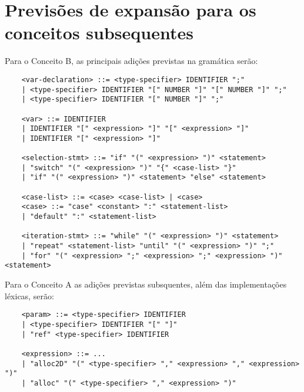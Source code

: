 \documentclass[10pt, a4paper]{article}
\begin{document}
\section{Previsões de expansão para os conceitos subsequentes}

Para o Conceito B, as principais adições previstas na gramática serão:
\begin{verbatim}
    <var-declaration> ::= <type-specifier> IDENTIFIER ";" 
    | <type-specifier> IDENTIFIER "[" NUMBER "]" "[" NUMBER "]" ";"
    | <type-specifier> IDENTIFIER "[" NUMBER "]" ";" 

    <var> ::= IDENTIFIER 
    | IDENTIFIER "[" <expression> "]" "[" <expression> "]"
    | IDENTIFIER "[" <expression> "]" 

    <selection-stmt> ::= "if" "(" <expression> ")" <statement> 
    | "switch" "(" <expression> ")" "{" <case-list> "}"
    | "if" "(" <expression> ")" <statement> "else" <statement>

    <case-list> ::= <case> <case-list> | <case>
    <case> ::= "case" <constant> ":" <statement-list> 
    | "default" ":" <statement-list>
    
    <iteration-stmt> ::= "while" "(" <expression> ")" <statement>
    | "repeat" <statement-list> "until" "(" <expression> ")" ";"
    | "for" "(" <expression> ";" <expression> ";" <expression> ")" <statement>
\end{verbatim}

Para o Conceito A as adições previstas subsquentes, além das implementações léxicas, serão:
\begin{verbatim}
    <param> ::= <type-specifier> IDENTIFIER 
    | <type-specifier> IDENTIFIER "[" "]" 
    | "ref" <type-specifier> IDENTIFIER 

    <expression> ::= ...
    | "alloc2D" "(" <type-specifier> "," <expression> "," <expression> ")" 
    | "alloc" "(" <type-specifier> "," <expression> ")" 
\end{verbatim}
\end{document}
